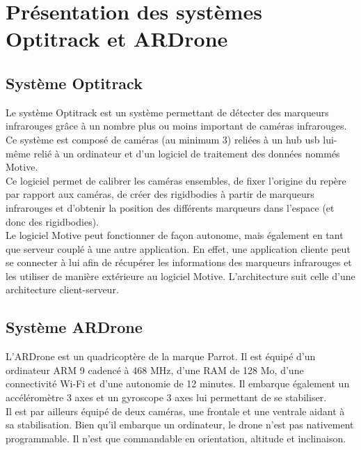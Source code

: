 \chapter{Présentation des systèmes Optitrack et ARDrone}

    \section{Système Optitrack}
        Le système Optitrack est un système permettant de détecter des marqueurs infrarouges grâce à un nombre plus ou moins important de caméras infrarouges. Ce système est composé de caméras (au minimum 3) reliées à un hub usb lui-même relié à un ordinateur et d'un logiciel de traitement des données nommés Motive. \\

        Ce logiciel permet de calibrer les caméras ensembles, de fixer l'origine du repère par rapport aux caméras, de créer des rigidbodies à partir de marqueurs infrarouges et d'obtenir la position des différents marqueurs dans l'espace (et donc des rigidbodies). \\

        Le logiciel Motive peut fonctionner de façon autonome, mais également en tant que serveur couplé à une autre application. En effet, une application cliente peut se connecter à lui afin de récupérer les informations des marqueurs infrarouges et les utiliser de manière extérieure au logiciel Motive. L'architecture suit celle d'une architecture client-serveur.


    \section{Système ARDrone}
        L'ARDrone est un quadricoptère de la marque Parrot. Il est équipé d'un ordinateur ARM 9 cadencé à 468 MHz, d'une RAM de 128 Mo, d'une connectivité Wi-Fi et d'une autonomie de 12 minutes. Il embarque également un accéléromètre 3 axes et un gyroscope 3 axes lui permettant de se stabiliser.\\

        Il est par ailleurs équipé de deux caméras, une frontale et une ventrale aidant à sa stabilisation. Bien qu'il embarque un ordinateur, le drone n'est pas nativement programmable. Il n'est que commandable en orientation, altitude et inclinaison.
